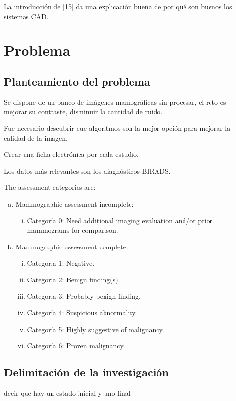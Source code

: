 La introducción de [15] da una explicación buena de por qué son buenos los
sistemas CAD.

\section{Problema}
\subsection{Planteamiento del problema}

Se dispone de un banco de imágenes mamográficas sin procesar, el reto es mejorar
su contraste, disminuir la cantidad de ruido.

Fue necesario descubrir que algoritmos son la mejor opción para mejorar la calidad de la imagen.

Crear una ficha electrónica por cada estudio.

Los datos más relevantes son los diagnósticos BIRADS.

The assessment categories are:
\begin{enumerate}[a)]
    \item Mammographic assessment incomplete:
    \begin{enumerate}[i.]
        \item Categoría 0: Need additional imaging evaluation and/or prior
        mammograms for comparison.
    \end{enumerate}
    \item Mammographic assessment complete:
    \begin{enumerate}[i.]
        \item Categoría 1: Negative.
        \item Categoría 2: Benign finding(s).
        \item Categoría 3: Probably benign finding.
        \item Categoría 4: Suspicious abnormality.
        \item Categoría 5: Highly suggestive of malignancy.         
        \item Categoría 6: Proven malignancy.
    \end{enumerate}
\end{enumerate}

\subsection{Delimitación de la investigación}

decir que hay un estado inicial y uno final

